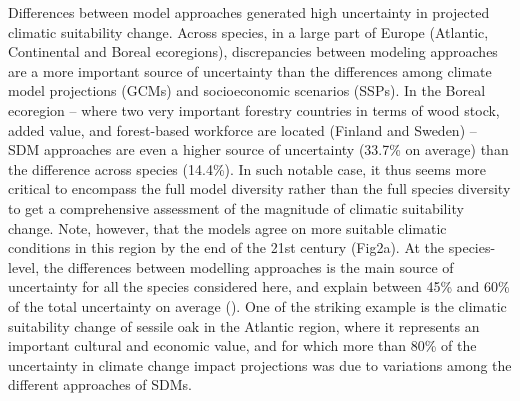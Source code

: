 \documentclass[letterpaper,8pt]{extarticle}  %
\begin{document}
\begin{doublespacing}
\begin{linenumbers}
Differences between model approaches generated high uncertainty in projected climatic suitability change. 
Across species, in a large part of Europe (Atlantic, Continental and Boreal ecoregions), discrepancies between modeling approaches are a more important source of uncertainty than the differences among climate model projections (GCMs) and socioeconomic scenarios (SSPs). In the Boreal ecoregion -- where two very important forestry countries in terms of wood stock, added value, and forest-based workforce are located (Finland and Sweden) -- SDM approaches are even a higher source of uncertainty (33.7\% on average) than the difference across species (14.4\%). In such notable case, it thus seems more critical to encompass the full model diversity rather than the full species diversity to get a comprehensive assessment of the magnitude of climatic suitability change. Note, however, that the models agree on more suitable climatic conditions in this region by the end of the 21st century (Fig2a). At the species-level, the differences between modelling approaches is the main source of uncertainty for all the species considered here, and explain between 45\% and 60\% of the total uncertainty on average (). 
One of the striking example is the climatic suitability change of sessile oak in the Atlantic region, where it represents an important cultural and economic value, and for which more than 80\% of the uncertainty in climate change impact projections was due to variations among the different approaches of SDMs.


\end{linenumbers}
\end{doublespacing}
\end{document}
